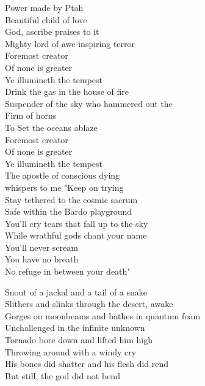 
Power made by Ptah\\
Beautiful child of love\\
God, ascribe praises to it\\
Mighty lord of awe-inspiring terror\\
Foremost creator\\
Of none is greater\\
Ye illumineth the tempest\\

Drink the gas in the house of fire\\
Suspender of the sky who hammered out the \\
Firm of horns\\
To Set the oceans ablaze\\
Foremost creator\\
Of none is greater\\
Ye illumineth the tempest\\

The apostle of conscious dying\\
whispers to me "Keep on trying\\
Stay tethered to the cosmic sacrum\\
Safe within the Bardo playground\\
You'll cry tears that fall up to the sky\\
While wrathful gods chant your name\\
You'll never scream\\
You have no breath\\
No refuge in between your death"\\



Snout of a jackal and a tail of a snake\\
Slithers and slinks through the desert, awake\\
Gorges on moonbeams and bathes in quantum foam\\
Unchallenged in the infinite unknown\\

Tornado bore down and lifted him high\\
Throwing  around with a windy cry\\
His bones did shatter and his flesh did rend\\
But still, the god did not bend\\

